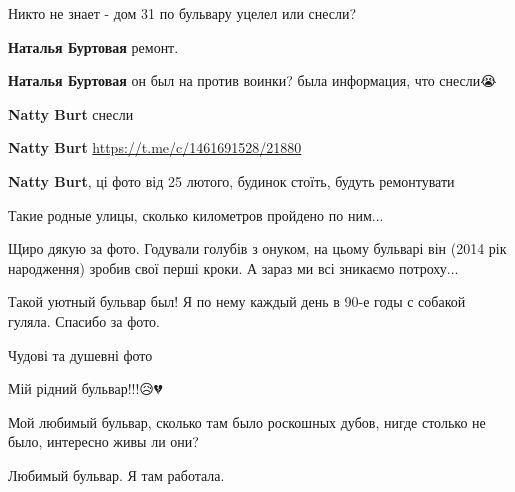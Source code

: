  
 
 
 
 

\qqSecCmt


Никто не знает - дом 31 по бульвару уцелел или снесли?

\begin{itemize} %
\textbf{Наталья Буртовая} ремонт.

\textbf{Наталья Буртовая} он был на против воинки? была информация, что снесли😭

\textbf{Natty Burt} снесли

\textbf{Natty Burt} \url{https://t.me/c/1461691528/21880}

\textbf{Natty Burt}, ці фото від 25 лютого, будинок стоїть, будуть ремонтувати
\end{itemize} %


Такие родные улицы, сколько километров пройдено по ним...


Щиро дякую за фото. Годували голубів з онуком, на цьому бульварі він (2014 рік
народження) зробив свої перші кроки. А зараз ми всі зникаємо потроху...


Такой уютный бульвар был! Я по нему каждый день в 90-е годы с собакой гуляла. Спасибо за фото.


Чудові та душевні фото


Мій рідний бульвар!!!😥💔


Мой любимый бульвар, сколько там было роскошных дубов, нигде столько не было,
интересно живы ли они?


Любимый бульвар. Я там работала.

